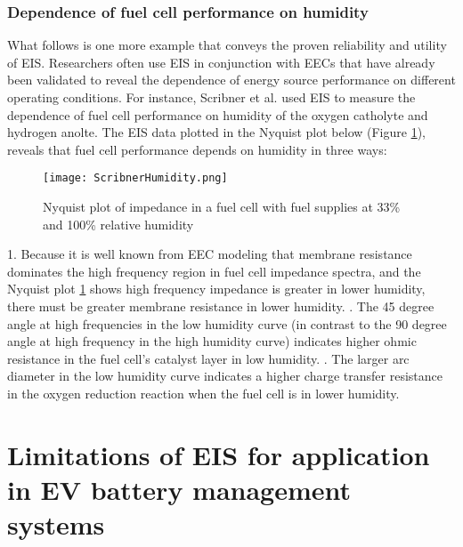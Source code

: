 			\subsubsection{Dependence of fuel cell performance on humidity}
What follows is one more example that conveys the proven reliability and utility of EIS. Researchers often use EIS in conjunction with EECs that have already been validated to reveal the dependence of energy source performance on different operating conditions. For instance, Scribner et al. used EIS to measure the dependence of fuel cell performance on humidity of the oxygen catholyte and hydrogen anolte. The EIS data plotted in the Nyquist plot below (Figure \ref{fig:ScribnerFuelCell}), reveals that fuel cell performance depends on humidity in three ways: \newline
\begin{figure}[H]
\centering
\texttt{[image: ScribnerHumidity.png]}
\caption{Nyquist plot of impedance in a fuel cell with fuel supplies at 33\% and 100\% relative humidity
\label{fig:ScribnerFuelCell}
\cite{ScribnerAssociates}}
\end{figure}
1. Because it is well known from EEC modeling that membrane resistance dominates the high frequency region in fuel cell impedance spectra, and the Nyquist plot \ref{fig:ScribnerFuelCell}  shows high frequency impedance is greater in lower humidity, there must be greater membrane resistance in lower humidity. . The 45 degree angle at high frequencies in the low humidity curve (in contrast to the 90 degree angle at high frequency in the high humidity curve) indicates higher ohmic resistance in the fuel cell's catalyst layer in low humidity. . The larger arc diameter in the low humidity curve indicates a higher charge transfer resistance in the oxygen reduction reaction when the fuel cell is in lower humidity.
	
	\section{Limitations of EIS for application in EV battery management systems}


